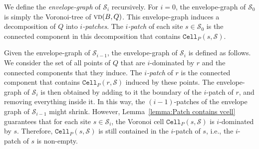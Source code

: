 \documentclass[a4paper,UKenglish]{socg-lipics-v2018}
\newcommand{\icell}[1][i]{${#1}$-patch\xspace}
\newcommand{\icells}[1][i]{${#1}$-patches\xspace}
\newcommand{\s}{\mathcal S}
\newcommand{\cell}[2][P]{\ensuremath{\mathtt{Cell}_{\scriptscriptstyle #1}(#2)}}
\newcommand{\vd}[2][P]{\textsc{vd}(#2, #1)}
\begin{document}
We define the \emph{envelope-graph} of $\s_i$ recursively. 
For $i = 0$, the envelope-graph of $\s_0$ is simply the Voronoi-tree of $\vd[Q]{B}$.
This envelope-graph induces a decomposition of $Q$ into \emph{\icells}.
The \emph{\icell} of each site $s\in \s_0$ is the connected component in this decomposition that contains $\cell{s, \s}$.

Given the envelope-graph of $\s_{i-1}$, the envelope-graph of $\s_i$ is defined as follows.
We consider the set of all points of $Q$ that are $i$-dominated by $r$ and the connected components that they induce. 
The \emph{\icell} of $r$ is the connected component that contains $\cell{r, \s}$ induced by these points.
The envelope-graph of $\s_i$ is then obtained by adding to it the boundary of the \icell of $r$, and removing everything inside it. 
In this way, the \icells[(i-1)] of the envelope graph of $\s_{i-1}$ might shrink. 
However, Lemma~\ref{lemma:Patch contains vcell} guarantees that for each site $s\in \s_i$, the Voronoi cell $\cell{s, \s}$ is $i$-dominated by $s$.
Therefore, $\cell{s, \s}$ is still contained in the \icell of $s$, i.e., the \icell of $s$ is non-empty.
\end{document}
